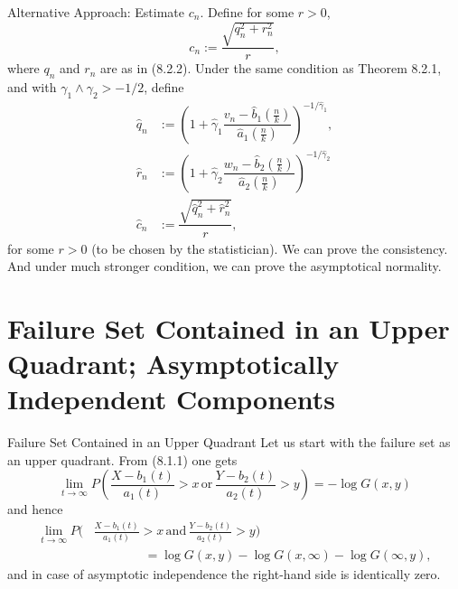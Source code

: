 \documentclass[11pt]{beamer}
\begin{document}
\begin{frame}{Alternative Approach: Estimate $c_n$.}
Define for some $r>0$, 
\begin{equation}\tag{8.2.9}
c_n:=\dfrac{\sqrt{q_n^2+r_n^2}}{r},
\end{equation}
where $q_n$ and $r_n$ are as in (8.2.2).  Under the same condition as Theorem 8.2.1, and with $\gamma_1 \land \gamma_2 >-1/2$, define
\begin{displaymath}
\begin{split}
\hat{q}_n &:=(1+\hat{\gamma}_1 \dfrac{v_n-\hat{b}_1(\frac{n}{k})}{\hat{a}_1(\frac{n}{k})})^{-1/\hat{\gamma}_1},\\
\hat{r}_n &:=(1+\hat{\gamma}_2 \dfrac{w_n-\hat{b}_2(\frac{n}{k})}{\hat{a}_2(\frac{n}{k})})^{-1/\hat{\gamma}_2}\\
\hat{c}_n &:=\dfrac{\sqrt{\hat{q}_n^2+\hat{r}_n^2}}{r},
\end{split}
\end{displaymath}
for some $r>0$ (to be chosen by the statistician). We can prove the consistency. And under much stronger condition, we can prove the asymptotical normality.
\end{frame}


\section{Failure Set Contained in an Upper Quadrant; Asymptotically Independent Components}


\begin{frame}{Failure Set Contained in an Upper Quadrant}
Let us start with the failure set as an upper quadrant. From (8.1.1) one gets
\begin{displaymath}
\lim_{t \to \infty} P(\frac{X-b_1(t)}{a_1(t)}> x \, \text{or}\, \frac{Y-b_2(t)}{a_2(t)}> y)=-\log G(x,y)
\end{displaymath}
and hence 
\begin{displaymath}
\begin{split}
\lim_{t \to \infty} P( &\frac{X-b_1(t)}{a_1(t)}> x \, \text{and}\, \frac{Y-b_2(t)}{a_2(t)}> y) \\
& \qquad\qquad = \log G(x,y)-\log G(x,\infty)-\log G(\infty,y),
\end{split}
\end{displaymath}
and in case of asymptotic independence the right-hand side is identically zero.
\end{frame}
\end{document}
